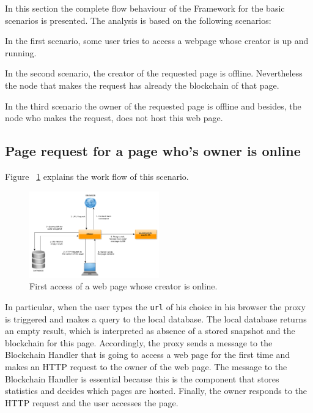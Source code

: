 
In this section the complete flow behaviour of the Framework for the basic scenarios 
is presented. The analysis is based on the following scenarios:

\begin{description}
\item In the first scenario, some user tries to access a webpage whose creator is up and running. 
\item In the second scenario, the creator of the requested page is offline. 
Nevertheless the node that makes the request has already the blockchain of that page.
\item In the third scenario the owner of the requested page is offline and besides, the node who 
makes the request, does not host this web page.
\end{description}

\subsection{Page request for a page who's owner is online}

Figure  ~\ref{fig:online_creator} explains the work flow of this scenario.

\begin{figure}[htp]
\center
\includegraphics[width=0.5\textwidth]{pictures/fetch_page_online_creator.pdf}
\caption{First access of a web page whose creator is online.}
\label{fig:online_creator}
\end{figure}

In particular, when the user types the \texttt{url} of his choice in his browser the proxy is
triggered and makes a query to the local database. The local database returns an empty result,
which is interpreted as absence of a stored snapshot and the blockchain for this page.
Accordingly, the proxy sends a message to the Blockchain Handler that is going to access 
a web page for the first time and makes an HTTP request to the owner of the web page. 
The message to the Blockchain Handler is essential because this is the component that stores 
statistics and decides which pages are hosted. Finally, the owner responds to the HTTP request
and the user accesses the page.

